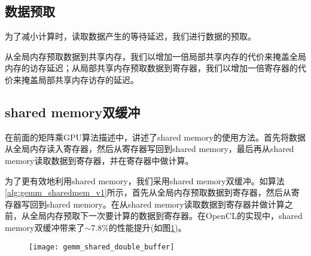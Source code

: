 \subsection{数据预取}
为了减小计算时，读取数据产生的等待延迟，我们进行数据的预取。

从全局内存预取数据到共享内存，我们以增加一倍局部共享内存的代价来掩盖全局内存的访存延迟；从局部共享内存预取数据到寄存器，我们以增加一倍寄存器的代价来掩盖局部共享内存访存的延迟。

\subsection{shared memory双缓冲}
在前面的矩阵乘GPU算法描述中，讲述了shared memory的使用方法。首先将数据从全局内存读入寄存器，然后从寄存器写回到shared memory，最后再从shared memory读取数据到寄存器，并在寄存器中做计算。

为了更有效地利用shared memory，我们采用shared memory双缓冲。如算法\ref{alg:gemm_sharedmem_v1}所示，首先从全局内存预取数据到寄存器，然后从寄存器写回到shared memory。在从shared memory读取数据到寄存器并做计算之前，从全局内存预取下一次要计算的数据到寄存器。在OpenCL的实现中，shared memory双缓冲带来了$\sim$7.8\%的性能提升(如图\ref{fig:gemm_shared_double_buffer})。
\begin{figure}[htbp]
	\centering
	\texttt{[image: gemm\_shared\_double\_buffer]}
	\label{fig:gemm_shared_double_buffer}
\end{figure}

